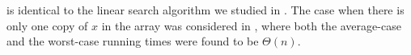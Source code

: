  is identical to the linear search algorithm we studied in .
The case when there is only one copy of $x$ in the array was considered in , where both the average-case and the worst-case running times were found to be $\Theta(n)$.
